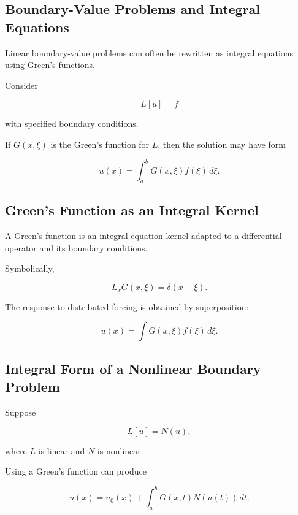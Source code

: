 \subsection{Boundary-Value Problems and Integral Equations}
\label{subsec:bvp-integral-equations}

Linear boundary-value problems can often be rewritten as integral
equations using Green's functions.

Consider

\[
\boxed{
L[u]=f
}
\]

with specified boundary conditions.

If \(G(x,\xi)\) is the Green's function for \(L\), then the solution may
have form

\[
\boxed{
u(x)
=
\int_a^b
G(x,\xi)f(\xi)\,d\xi.
}
\]

\subsection{Green's Function as an Integral Kernel}
\label{subsec:greens-function-integral-kernel}

A Green's function is an integral-equation kernel adapted to a
differential operator and its boundary conditions.

Symbolically,

\[
\boxed{
L_xG(x,\xi)
=
\delta(x-\xi).
}
\]

The response to distributed forcing is obtained by superposition:

\[
\boxed{
u(x)
=
\int
G(x,\xi)f(\xi)\,d\xi.
}
\]

\subsection{Integral Form of a Nonlinear Boundary Problem}
\label{subsec:nonlinear-bvp-integral-form}

Suppose

\[
L[u]
=
N(u),
\]

where \(L\) is linear and \(N\) is nonlinear.

Using a Green's function can produce

\[
\boxed{
u(x)
=
u_0(x)
+
\int_a^b
G(x,t)
N(u(t))
\,dt.
}
\]

